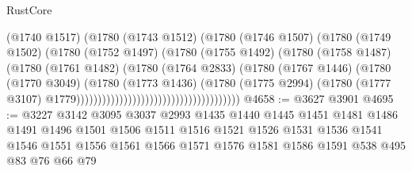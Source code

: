 \begin{lexlean}{RustCore}
\begin{coremodule}
                                                      (@1740 @1517)
                                                      (@1780
                                                        (@1743 @1512)
                                                        (@1780
                                                          (@1746 @1507)
                                                          (@1780
                                                            (@1749 @1502)
                                                            (@1780
                                                              (@1752 @1497)
                                                              (@1780
                                                                (@1755 @1492)
                                                                (@1780
                                                                  (@1758 @1487)
                                                                  (@1780
                                                                    (@1761 @1482)
                                                                    (@1780
                                                                      (@1764 @2833)
                                                                      (@1780
                                                                        (@1767 @1446)
                                                                        (@1780
                                                                          (@1770 @3049)
                                                                          (@1780
                                                                            (@1773 @1436)
                                                                            (@1780
                                                                              (@1775 @2994)
                                                                              (@1780
                                                                                (@1777 @3107)
                                                                                @1779))))))))))))))))))))))))))))))))))))))
@4658 := @3627 @3901
@4695 := @3227
    @3142
    @3095
    @3037
    @2993
    @1435
    @1440
    @1445
    @1451
    @1481
    @1486
    @1491
    @1496
    @1501
    @1506
    @1511
    @1516
    @1521
    @1526
    @1531
    @1536
    @1541
    @1546
    @1551
    @1556
    @1561
    @1566
    @1571
    @1576
    @1581
    @1586
    @1591
    @538
    @495
    @83
    @76
    @66
    @79

\end{coremodule}
\end{lexlean}
